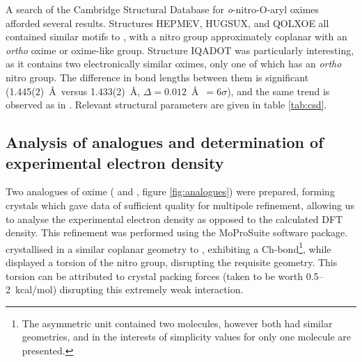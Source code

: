 \begin{refsection}
A search of the Cambridge Structural Database for \emph{o}-nitro-O-aryl oximes afforded several results.\autocite{CSD}
Structures HEPMEV, HUGSUX, and QOLXOE all contained similar motifs to , with a nitro group approximately coplanar with an \emph{ortho} oxime or oxime-like group.\autocite{Saavedra2001,Kostyanovsky2002,Saavedra2006a}
Structure IQADOT was particularly interesting, as it contains two electronically similar oximes, only one of which has an \emph{ortho} nitro group.\autocite{Renaudet2003}
The difference in bond lengths between them is significant (1.445(2)~\AA~versus 1.433(2)~\AA, $\Delta = 0.012$~\AA~$= 6\sigma$), and the same trend is observed as in .
Relevant structural parameters are given in table \cref{tab:csd}.

\subsection{Analysis of analogues and determination of experimental electron density}
Two analogues of oxime  ( and , figure \cref{fig:analogues}) were prepared, forming crystals which gave data of sufficient quality for multipole refinement, allowing us to analyse the experimental electron density as opposed to the calculated DFT density.\autocite{Hansen1978}
This refinement was performed using the MoProSuite software package.\autocite{Jelsch2005}
 crystallised in a similar coplanar geometry to , exhibiting a Ch-bond\footnote[1]{The asymmetric unit contained two molecules, however both had similar geometries, and in the interests of simplicity values for only one molecule are presented.}, while  displayed a torsion of the nitro group, disrupting the requisite geometry.
This torsion can be attributed to crystal packing forces (taken to be worth 0.5--2~kcal/mol) disrupting this extremely weak interaction.\autocite{Dunitz2009}


\end{refsection}
